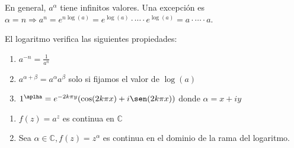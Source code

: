 \begin{obs}
  En general, $a^{\alpha}$ tiene infinitos valores. Una excepción es $\alpha = n \Rightarrow a^{n} = e^{n \log(a)} = e^{\log(a)} \cdot \cdots \cdot e^{\log(a)} = a \cdot \cdots \cdot a$.
\end{obs}

\begin{prop}
  El logaritmo verifica las siguientes propiedades:
  \begin{enumerate}[label=(\roman*)]
    \item $a^{-n} = \frac{1}{a^{n}}$
    \item $a^{\alpha + \beta} = a^{\alpha}a^{\beta}$ solo si fijamos el valor de $ \log(a)$
    \item $1^{\aplha} = e^{-2k\pi y}(\cos(2k\pi x) + i \sen(2k\pi x))$ donde $\alpha = x +iy$
  \end{enumerate}
\end{prop}

\begin{prop}
  \begin{enumerate}[label=(\roman*)]
    \item $f(z) = a^{z}$ es continua en $\mathbb{C}$ 
    \item Sea $\alpha \in \mathbb{C}, f(z) = z^{\alpha}$ es continua en el dominio de la rama del logaritmo.
  \end{enumerate}
\end{prop}
